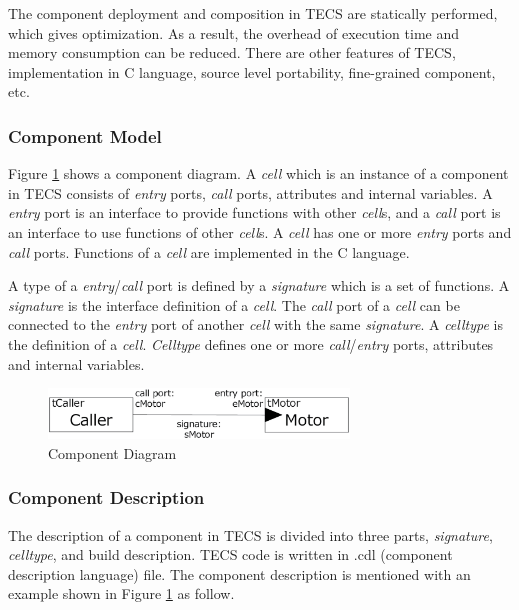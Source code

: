 \documentclass{sig-alternate-05-2015}
\begin{document}
The component deployment and composition in TECS are statically performed, which gives optimization.
As a result, the overhead of execution time and memory consumption can be reduced.
There are other features of TECS, implementation in C language, source level portability, fine-grained component, etc.

\subsubsection{Component Model}
Figure \ref{fig:component} shows a component diagram.
A {\it cell} which is an instance of a component in TECS consists of {\it entry} ports, {\it call} ports, attributes and internal variables.
A {\it entry} port is an interface to provide functions with other {\it cell}s, and a {\it call} port is an interface to use functions of other {\it cell}s.
A {\it cell} has one or more {\it entry} ports and {\it call} ports.
Functions of a {\it cell} are implemented in the C language.

A type of a {\it entry}/{\it call} port is defined by a {\it signature} which is a set of functions.
A {\it signature} is the interface definition of a {\it cell}.
The {\it call} port of a {\it cell} can be connected to the {\it entry} port of another {\it cell} with the same {\it signature}.
A {\it celltype} is the definition of a {\it cell}.
{\it Celltype} defines one or more {\it call}/{\it entry} ports, attributes and internal variables.

\begin{figure}[t]
    \centering
    \includegraphics[width=8cm,clip]{figure/component_diagram.eps}
    \caption{Component Diagram}
    \label{fig:component}
\end{figure}

\subsubsection{Component Description}
The description of a component in TECS is divided into three parts, {\it signature}, {\it celltype}, and build description.
TECS code is written in .cdl (component description language) file.
The component description is mentioned with an example shown in Figure \ref{fig:component} as follow.
\end{document}
